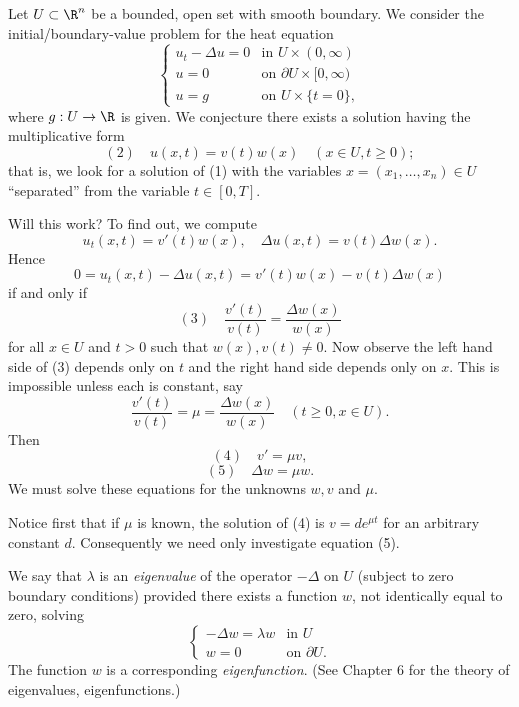 \begin{example}
\label{ex:heat-equation-separation-of-variables}
Let $U \subset \R^n$ be a bounded, open set with smooth boundary. We consider the initial/boundary-value problem for the heat equation
$$\begin{cases}
u_t - \Delta u = 0 & \text{in } U \times (0,\infty) \\
u = 0 & \text{on } \partial U \times [0,\infty) \\
u = g & \text{on } U \times \{t = 0\},
\end{cases}$$
where $g : U \to \R$ is given. We conjecture there exists a solution having the multiplicative form
$$(2) \quad u(x,t) = v(t)w(x) \quad (x \in U, t \geq 0);$$
that is, we look for a solution of (1) with the variables $x = (x_1, \ldots, x_n) \in U$ ``separated'' from the variable $t \in [0, T]$.

Will this work? To find out, we compute
$$u_t(x,t) = v'(t)w(x), \quad \Delta u(x,t) = v(t)\Delta w(x).$$
Hence
$$0 = u_t(x,t) - \Delta u(x,t) = v'(t)w(x) - v(t)\Delta w(x)$$
if and only if
$$(3) \quad \frac{v'(t)}{v(t)} = \frac{\Delta w(x)}{w(x)}$$
for all $x \in U$ and $t > 0$ such that $w(x), v(t) \neq 0$. Now observe the left hand side of (3) depends only on $t$ and the right hand side depends only on $x$. This is impossible unless each is constant, say
$$\frac{v'(t)}{v(t)} = \mu = \frac{\Delta w(x)}{w(x)} \quad (t \geq 0, x \in U).$$
Then
$$(4) \quad v' = \mu v,$$
$$(5) \quad \Delta w = \mu w.$$
We must solve these equations for the unknowns $w, v$ and $\mu$.

Notice first that if $\mu$ is known, the solution of (4) is $v = de^{\mu t}$ for an arbitrary constant $d$. Consequently we need only investigate equation (5).

We say that $\lambda$ is an \textit{eigenvalue} of the operator $-\Delta$ on $U$ (subject to zero boundary conditions) provided there exists a function $w$, not identically equal to zero, solving
$$\begin{cases}
-\Delta w = \lambda w & \text{in } U \\
w = 0 & \text{on } \partial U.
\end{cases}$$
The function $w$ is a corresponding \textit{eigenfunction}. (See Chapter 6 for the theory of eigenvalues, eigenfunctions.)


\end{example}
